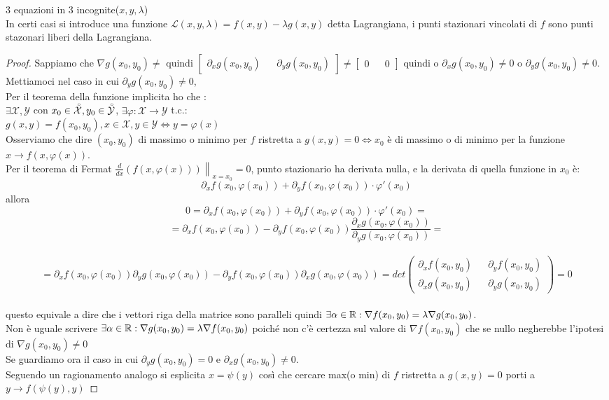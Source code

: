 3 equazioni in 3 incognite($x,y,\lambda$)\\
In certi casi si introduce una funzione $\mathcal{L}(x,y,\lambda) = f(x,y)-\lambda g(x,y)$ detta Lagrangiana, i punti stazionari vincolati di $f$ sono punti stazonari liberi della Lagrangiana.\\
\begin{proof}
	Sappiamo che $\nabla g(x_0,y_0)\ne$ quindi $\begin{bmatrix}\partial_xg(x_0,y_0) &&\partial_yg(x_0,y_0)\end{bmatrix}\ne\begin{bmatrix}0&&0\end{bmatrix}$ quindi o $\partial_xg(x_0,y_0)\ne 0$ o $\partial_yg(x_0,y_0)\ne 0$.
	Mettiamoci nel caso in cui $\partial_yg(x_0,y_0)\ne 0$,\\
    Per il teorema della funzione implicita ho che :\\
	$\exists\mathcal{X},\mathcal{Y}$ con $x_0\in\accentset{\circ}{\mathcal{X}}, y_0\in\accentset{\circ}{\mathcal{Y}}$, $\exists\varphi:\mathcal{X}\rightarrow\mathcal{Y}$ t.c.:\\
	$g(x,y)=f(x_0,y_0), x\in\mathcal{X}, y\in\mathcal{Y} \Leftrightarrow y=\varphi(x)$\\
	Osserviamo che dire $(x_0,y_0)$ di massimo o minimo per $f$ ristretta a $g(x,y)=0\Leftrightarrow x_0$ è di massimo o di minimo per la funzione $x\rightarrow f(x,\varphi(x))$.\\
	Per il teorema di Fermat $\left.\frac{d}{dx}(f(x,\varphi(x)))\right\|_{x=x_0}=0$, punto stazionario ha derivata nulla, e la derivata di quella funzione in $x_0$ è:
	$$\partial_xf(x_0,\varphi(x_0))+\partial_yf(x_0,\varphi(x_0))\cdot\varphi'(x_0)$$ 
	allora
	$$0=\partial_xf(x_0,\varphi(x_0))+\partial_yf(x_0,\varphi(x_0))\cdot\varphi'(x_0)=$$
	$$=\partial_xf(x_0,\varphi(x_0))-\partial_yf(x_0,\varphi(x_0))\frac{\partial_xg(x_0,\varphi(x_0))}{\partial_yg(x_0,\varphi(x_0))}=$$\\
	$$=\partial_xf(x_0,\varphi(x_0))\partial_yg(x_0,\varphi(x_0))-\partial_yf(x_0,\varphi(x_0))\partial_xg(x_0,\varphi(x_0))=det\left(\begin{matrix}\partial_xf(x_0,y_0)&&\partial_yf(x_0,y_0)\\\partial_xg(x_0,y_0)&&\partial_yg(x_0,y_0)\end{matrix}\right)=0$$\\
	questo equivale a dire che i vettori riga della matrice sono paralleli quindi $\exists\alpha\in \mathbb{R} : \nabla f(x_0,y_0)=\lambda\nabla g(x_0,y_0)$.\\
	Non è uguale scrivere $\exists\alpha\in \mathbb{R} : \nabla g(x_0,y_0)=\lambda\nabla f(x_0,y_0)$ poiché non c'è certezza sul valore di $\nabla f(x_0,y_0)$ che se nullo negherebbe l'ipotesi di $\nabla g(x_0,y_0)\ne 0$\\
	Se guardiamo ora il caso in cui $\partial_yg(x_0,y_0)=0$ e $\partial_xg(x_0,y_0)\ne 0$.\\
	Seguendo un ragionamento analogo si esplicita $x=\psi(y)$ così che cercare max(o min) di $f$ ristretta a $g(x,y)=0$ porti a $y\rightarrow f(\psi(y),y)$ 
\end{proof}
